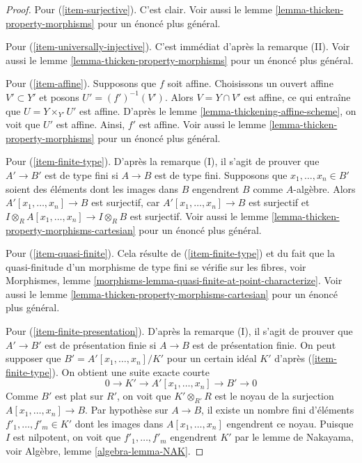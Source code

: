 \begin{proof}
\medskip\noindent
Pour (\ref{item-surjective}). C'est clair. Voir aussi
le lemme \ref{lemma-thicken-property-morphisms} pour un énoncé plus général.

\medskip\noindent
Pour (\ref{item-universally-injective}). C'est immédiat d'après la remarque (II). Voir aussi
le lemme \ref{lemma-thicken-property-morphisms} pour un énoncé plus général.

\medskip\noindent
Pour (\ref{item-affine}). Supposons que $f$ soit affine. Choisissons un
ouvert affine $V' \subset Y'$ et posons $U' = (f')^{-1}(V')$.
Alors $V = Y \cap V'$ est affine, ce qui entraîne que
$U = Y \times_{Y'} U'$ est affine. D'après
le lemme \ref{lemma-thickening-affine-scheme},
on voit que $U'$ est affine. Ainsi, $f'$ est affine. Voir aussi
le lemme \ref{lemma-thicken-property-morphisms} pour un énoncé plus général.

\medskip\noindent
Pour (\ref{item-finite-type}). D'après la remarque (I), il s'agit de prouver que $A' \to B'$
est de type fini si $A \to B$ est de type fini. Supposons que
$x_1, \ldots, x_n \in B'$ soient des éléments dont les images dans $B$ engendrent $B$
comme $A$-algèbre. Alors $A'[x_1, \ldots, x_n] \to B$ est surjectif,
car $A'[x_1, \ldots, x_n] \to B$ est surjectif et
$I \otimes_R A[x_1, \ldots, x_n] \to I \otimes_R B$ est surjectif. Voir aussi
le lemme \ref{lemma-thicken-property-morphisms-cartesian}
pour un énoncé plus général.

\medskip\noindent
Pour (\ref{item-quasi-finite}). Cela résulte de (\ref{item-finite-type}) et du fait que
la quasi-finitude d'un morphisme de type fini se vérifie sur les fibres, voir
Morphismes, lemme \ref{morphisms-lemma-quasi-finite-at-point-characterize}.
Voir aussi le lemme \ref{lemma-thicken-property-morphisms-cartesian}
pour un énoncé plus général.

\medskip\noindent
Pour (\ref{item-finite-presentation}). D'après la remarque (I), il s'agit de prouver que
$A' \to B'$ est de présentation finie si $A \to B$ est de présentation finie.
On peut supposer que $B' = A'[x_1, \ldots, x_n]/K'$ pour un certain idéal $K'$ d'après
(\ref{item-finite-type}). On obtient une suite exacte courte
$$
0 \to K' \to A'[x_1, \ldots, x_n] \to B' \to 0
$$
Comme $B'$ est plat sur $R'$, on voit que $K' \otimes_{R'} R$ est le noyau de
la surjection $A[x_1, \ldots, x_n] \to B$. Par hypothèse sur $A \to B$,
il existe un nombre fini d'éléments $f'_1, \ldots, f'_m \in K'$ dont les images dans
$A[x_1, \ldots, x_n]$ engendrent ce noyau. Puisque $I$ est nilpotent, on voit
que $f'_1, \ldots, f'_m$ engendrent $K'$ par le lemme de Nakayama, voir
Algèbre, lemme \ref{algebra-lemma-NAK}.


\end{proof}
